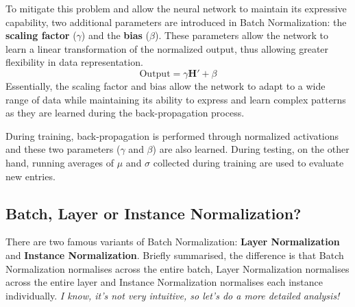 To mitigate this problem and allow the neural network to maintain its expressive capability, two additional parameters are introduced in Batch Normalization: the \textbf{scaling factor} ($ \gamma $) and the \textbf{bias} ($ \beta $). These parameters allow the network to learn a linear transformation of the normalized output, thus allowing greater flexibility in data representation. 
$$\text{Output} = \gamma \mathbf{H}' + \beta $$
Essentially, the scaling factor and bias allow the network to adapt to a wide range of data while maintaining its ability to express and learn complex patterns as they are learned during the back-propagation process.

During training, back-propagation is performed through normalized activations and these two parameters ($\gamma$ and $\beta$) are also learned. During testing, on the other hand, running averages of $ \mu $ and $ \sigma $ collected during training are used to evaluate new entries.


\subsection{Batch, Layer or Instance Normalization?}

There are two famous variants of Batch Normalization: \textbf{Layer Normalization} and \textbf{Instance Normalization}. Briefly summarised, the difference is that Batch Normalization normalises across the entire batch, Layer Normalization normalises across the entire layer and Instance Normalization normalises each instance individually. \textit{I know, it's not very intuitive, so let's do a more detailed analysis!}

